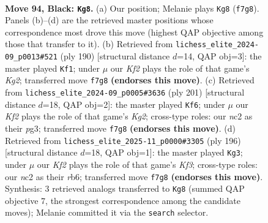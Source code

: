 \documentclass[11pt]{article}
\begin{document}
\clearpage

\begin{figure}[p]\centering
\begin{subfigure}{0.46\textwidth}\centering
\resizebox{\linewidth}{!}{%
\newchessgame
\chessboard[
  setfen={8/3r1kp1/5p2/7p/7P/6P1/1RN2K2/8 b - - 13 94},
  showmover=false,
  pgfstyle=straightmove, color=movearrow, markmove={f7-g8}
]}
\caption{}
\end{subfigure}\hfill
\begin{subfigure}{0.46\textwidth}\centering
\resizebox{\linewidth}{!}{%
\newchessgame
\chessboard[
  setfen={R7/6k1/6p1/7p/7P/5PP1/1r4K1/8 w - - 1 96},
  showmover=false,
  pgfstyle=straightmove, color=movearrow, markmove={g2-f1}
]}
\caption{}
\end{subfigure}
\\[4pt]
\begin{subfigure}{0.46\textwidth}\centering
\resizebox{\linewidth}{!}{%
\newchessgame
\chessboard[
  setfen={8/R5k1/3p2pp/8/6P1/4KPP1/1r6/8 b - - 1 101},
  showmover=false,
  pgfstyle=straightmove, color=movearrow, markmove={g7-f6}
]}
\caption{}
\end{subfigure}\hfill
\begin{subfigure}{0.46\textwidth}\centering
\resizebox{\linewidth}{!}{%
\newchessgame
\chessboard[
  setfen={6k1/6p1/1r5p/R6P/6P1/5K2/8/8 w - - 53 99},
  showmover=false,
  pgfstyle=straightmove, color=movearrow, markmove={f3-g3}
]}
\caption{}
\end{subfigure}
\caption{\textbf{Move 94, Black: \texttt{Kg8}.} (a) Our position; Melanie plays \texttt{Kg8} (\texttt{f7g8}). Panels (b)--(d) are the retrieved master positions whose correspondence most drove this move (highest QAP objective among those that transfer to it). (b) Retrieved from \texttt{lichess\_elite\_2024-09\_p0013\#521} (ply 190) [structural distance $d$=14, QAP obj=3]: the master played \texttt{Kf1}; under $\mu$ our \emph{Kf2} plays the role of that game's \emph{Kg2}; transferred move \texttt{f7g8} \textbf{(endorses this move)}. (c) Retrieved from \texttt{lichess\_elite\_2024-09\_p0005\#3636} (ply 201) [structural distance $d$=18, QAP obj=2]: the master played \texttt{Kf6}; under $\mu$ our \emph{Kf2} plays the role of that game's \emph{Kg2}; cross-type roles: our \emph{n}c2 as their \emph{p}g3; transferred move \texttt{f7g8} \textbf{(endorses this move)}. (d) Retrieved from \texttt{lichess\_elite\_2025-11\_p0000\#3305} (ply 196) [structural distance $d$=18, QAP obj=1]: the master played \texttt{Kg3}; under $\mu$ our \emph{Kf2} plays the role of that game's \emph{Kf3}; cross-type roles: our \emph{n}c2 as their \emph{r}b6; transferred move \texttt{f7g8} \textbf{(endorses this move)}. Synthesis: 3 retrieved analogs transferred to \texttt{Kg8} (summed QAP objective 7, the strongest correspondence among the candidate moves); Melanie committed it via the \texttt{search} selector.}
\label{fig:thought-m187}
\end{figure}
\end{document}
